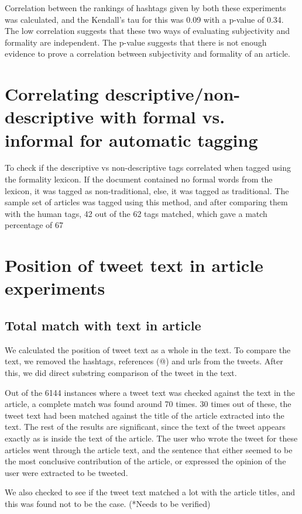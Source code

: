 Correlation between the rankings of hashtags given by both these experiments was calculated, and the Kendall’s tau for this was 0.09 with a p-value of 0.34. The low correlation suggests that these two ways of evaluating subjectivity and formality are independent. The p-value suggests that there is not enough evidence to prove a correlation between subjectivity and formality of an article.

\section{Correlating descriptive/non-descriptive with formal vs. informal for automatic tagging}

To check if the descriptive vs non-descriptive tags correlated when tagged using the formality lexicon. If the document contained no formal words from the lexicon, it was tagged as non-traditional, else, it was tagged as traditional. The sample set of articles was tagged using this method, and after comparing them with the human tags, 42 out of the 62 tags matched, which gave a match percentage of 67%

\section{Position of tweet text in article experiments}
\subsection {Total match with text in article}

We calculated the position of tweet text as a whole in the text. To compare the text, we removed the hashtags, references (@) and urls from the tweets. After this, we did direct substring comparison of the tweet in the text. 

Out of the 6144 instances where a tweet text was checked against the text in the article, a complete match was found around 70 times. 30 times out of these, the tweet text had been matched against the title of the article extracted into the text. The rest of the results are significant, since the text of the tweet appears exactly as is inside the text of the article. The user who wrote the tweet for these articles went through the article text, and the sentence that either seemed to be the most conclusive contribution of the article, or expressed the opinion of the user were extracted to be tweeted. 

We also checked to see if the tweet text matched a lot with the article titles, and this was found not to be the case. (*Needs to be verified)

